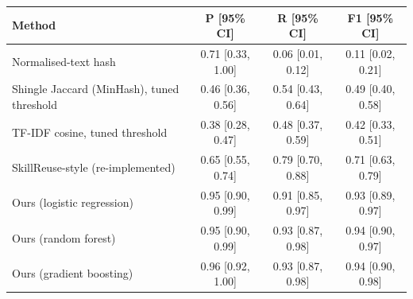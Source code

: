 \begin{tabular}{lccc}
\toprule
Method & P [95\% CI] & R [95\% CI] & F1 [95\% CI] \\
\midrule
Normalised-text hash & 0.71 [0.33, 1.00] & 0.06 [0.01, 0.12] & 0.11 [0.02, 0.21] \\
Shingle Jaccard (MinHash), tuned threshold & 0.46 [0.36, 0.56] & 0.54 [0.43, 0.64] & 0.49 [0.40, 0.58] \\
TF-IDF cosine, tuned threshold & 0.38 [0.28, 0.47] & 0.48 [0.37, 0.59] & 0.42 [0.33, 0.51] \\
SkillReuse-style (re-implemented) & 0.65 [0.55, 0.74] & 0.79 [0.70, 0.88] & 0.71 [0.63, 0.79] \\
\midrule
Ours (logistic regression) & 0.95 [0.90, 0.99] & 0.91 [0.85, 0.97] & 0.93 [0.89, 0.97] \\
Ours (random forest) & 0.95 [0.90, 0.99] & 0.93 [0.87, 0.98] & 0.94 [0.90, 0.97] \\
Ours (gradient boosting) & 0.96 [0.92, 1.00] & 0.93 [0.87, 0.98] & 0.94 [0.90, 0.98] \\
\bottomrule
\end{tabular}
